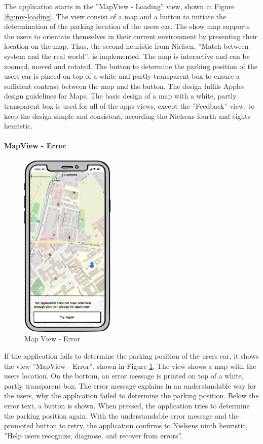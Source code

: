 The application starts in the ''MapView - Loading'' view, shown in Figure \ref{fig:mv-loading}. The view consist of a map and a button to initiate the determination of the parking location of the users car. The show map supports the users to orientate themselves in their current environment by presenting their location on the map. Thus, the second heuristic from Nielsen, ''Match between system and the real world'', is implemented. The map is interactive and can be zoomed, moved and rotated. The button to determine the parking position of the users car is placed on top of a white and partly transparent box to ensure a sufficient contrast between the map and the button. The design fulfils Apples design guidelines for Maps. The basic design of a map with a white, partly transparent box is used for all of the apps views, except the ''Feedback'' view, to keep the design simple and consistent, according tho Nielsens fourth and eights heuristic. \cite{nielsen1994usability} \cite{apple:interfaceguidliines}


\paragraph{MapView - Error}

\begin{figure}[h]
    \centering
    \includegraphics[width=0.4\textwidth]{images/UI/Iteration4-MapView-Error.png}
    \caption{Map View - Error}
    \label{fig:mv-error}
\end{figure}

If the application fails to determine the parking position of the users car, it shows the view ''MapView - Error'', shown in Figure \ref{fig:mv-error}. The view shows a map with the users location. On the bottom, an error message is printed on top of a white, partly transparent box. The error message explains in an understandable way for the users, why the application failed to determine the parking position. Below the error text, a button is shown. When pressed, the application tries to determine the parking position again. With the understandable error message and the promoted button to retry, the application confirms to Nielsens ninth heuristic, ''Help users recognize, diagnose, and recover from errors''. \cite{nielsen1994usability}

